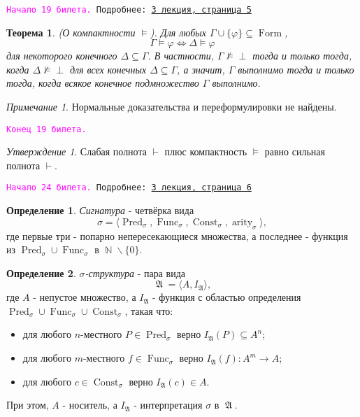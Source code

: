 \documentclass[a4paper,100pt]{article}
\theoremstyle{indented}
\newtheorem{theorem}{Теорема}
\theoremstyle{definition}
\newtheorem{defn}{Определение}
\theoremstyle{remark}
\newtheorem{remark}{Примечание}
\newtheorem{stat}{Утверждение}
\DeclareMathOperator{\ra}{\rightarrow}
\DeclareMathOperator{\Llra}{\Longleftrightarrow}
\DeclareMathOperator{\NN}{\mathbb{N}}
\DeclareMathOperator{\form}{Form}
\DeclareMathOperator{\Pred}{Pred}
\DeclareMathOperator{\Func}{Func}
\DeclareMathOperator{\Const}{Const}
\DeclareMathOperator{\arity}{arity}
\DeclareMathOperator{\GA}{\mathfrak{A}}
\begin{document}
\hrulefill

\texttt{\hypertarget{b19}{\textcolor{magenta}{Начало 19 билета.}} Подробнее: \href{http://www.mi-ras.ru/~speranski/courses/logic-1-2021-spring/slides_3.pdf}{3 лекция, страница 5}} \\

\begin{theorem}
  (О компактности $\vDash$). Для любых $\Gamma \cup \{\varphi\}\subseteq \form$, 
  \[
    \Gamma \vDash \varphi \Llra \Delta \vDash \varphi
  \]
  для некоторого конечного $\Delta \subseteq \Gamma$. В частности, $\Gamma \nvDash \perp$ тогда и только тогда, когда $\Delta \nvDash \perp$ для всех конечных $\Delta \subseteq \Gamma$, а значит, $\Gamma$ выполнимо тогда и только тогда, когда всякое конечное подмножество $\Gamma $ выполнимо.
\end{theorem}

\begin{remark}
  Нормальные доказательства и переформулировки не найдены.
\end{remark}

\texttt{\textcolor{magenta}{Конец 19 билета.}} 

\hrulefill

\begin{stat}
  Слабая полнота $\vdash$ плюс компактность $\vDash$ равно сильная полнота $\vdash$. 
\end{stat}

\hrulefill

\texttt{\hypertarget{b24}{\textcolor{magenta}{Начало 24 билета.}} Подробнее: \href{http://www.mi-ras.ru/~speranski/courses/logic-1-2021-spring/slides_3.pdf}{3 лекция, страница 6}} \\

\begin{defn}
  \textit{Сигнатура} - четвёрка вида 
  \[
    \sigma = \langle \Pred_\sigma, \Func_\sigma, \Const_\sigma, \arity_\sigma \rangle,
  \]
  где первые три - попарно непересекающиеся множества, а последнее - функция из $\Pred_\sigma \cup \Func_\sigma$ в $\NN\backslash \{0\}$. 
\end{defn}

\begin{defn}
  \textit{$\sigma$-структура} - пара вида 
  \[
    \GA = \langle A, I_{\GA}\rangle, 
  \]
  где $A$ - непустое множество, а $I_{\GA}$ - функция с областью определения $\Pred_\sigma \cup \Func_\sigma \cup \Const_\sigma$, такая что:

  \begin{itemize}
    \item для любого $n$-местного $P\in \Pred_\sigma$ верно $I_{\GA}(P)\subseteq A^n$; 
    \item для любого $m$-местного $f\in \Func_\sigma$ верно $I_{\GA}(f):A^m\ra A$; 
    \item для любого $c\in\Const_\sigma$ верно $I_{\GA}(c)\in A$. 
  \end{itemize}

  При этом, $A$ - носитель, а $I_{\GA}$ - интерпретация $\sigma$ в $\GA$. 
\end{defn}
\end{document}
